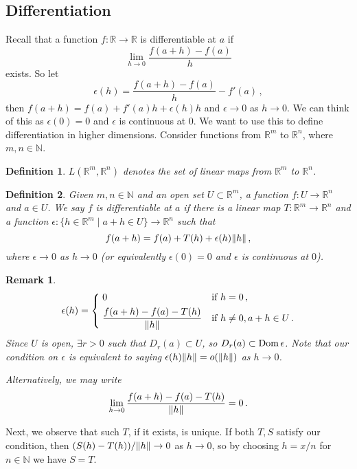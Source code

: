 \documentclass{article}
\theoremstyle{plain}\theoremheaderfont{\normalfont\itshape}\theorembodyfont{\rmfamily}\theoremseparator{.}\newtheorem*{rem}{Remark}\newtheorem*{ex}{Example}\newtheorem*{proof}{Proof}\newtheorem*{altp}{Alternative proof}
\theoremstyle{plain}\theoremheaderfont{\normalfont\bfseries}\theorembodyfont{\rmfamily}\theoremseparator{.}\newtheorem{thm}{Theorem}[section]\newtheorem{lem}[thm]{Lemma}\newtheorem{prop}[thm]{Proposition}\newtheorem*{cor}{Corollary}\newtheorem{defn}[thm]{Definition}\newtheorem{clm}[thm]{Claim}\newtheorem{clminproof}{Claim}
\theoremstyle{break}\theoremheaderfont{\normalfont\itshape}\theorembodyfont{\rmfamily}\theoremseparator{.\medskip}\newtheorem*{proofskip}{Proof}\newtheorem*{exs}{Examples}\newtheorem*{rems}{Remarks}
\theoremstyle{break}\theoremheaderfont{\normalfont\bfseries}\theorembodyfont{\rmfamily}\theoremseparator{.\medskip}\newtheorem{lemskip}[thm]{Lemma}\newtheorem{defnskip}[thm]{Definition}\newtheorem{propskip}[thm]{Proposition}\newtheorem{thmskip}[thm]{Theorem}
\DeclareMathOperator{\Dom}{Dom}
\begin{document}
    \subsection{Differentiation}
    Recall that a function \(f:\mathbb{R}\to\mathbb{R}\) is differentiable at \(a\) if
    \[\lim_{h\to 0}\frac{f(a+h)-f(a)}{h}\]
    exists. So let
    \[\epsilon(h)=\frac{f(a+h)-f(a)}{h}-f'(a)\,,\]
    then \(f(a+h)=f(a)+f'(a)h+\epsilon(h)h\) and \(\epsilon\to 0\) as \(h\to 0\). We can think of this as \(\epsilon(0)=0\) and \(\epsilon\) is continuous at \(0\). We want to use this to define differentiation in higher dimensions. Consider functions from \(\mathbb{R}^m\) to \(\mathbb{R}^n\), where \(m,n\in\mathbb{N}\).
    \begin{defn}
        \(L(\mathbb{R}^m,\mathbb{R}^n)\) denotes the set of linear maps from \(\mathbb{R}^m\) to \(\mathbb{R}^n\).
    \end{defn}
    \begin{defn}
        Given \(m,n\in\mathbb{N}\) and an open set \(U\subset\mathbb{R}^m\), a function \(f:U\to\mathbb{R}^n\) and \(a\in U\). We say \(f\) is \textit{differentiable} at \(a\) if there is a linear map \(T:\mathbb{R}^m\to\mathbb{R}^n\) and a function \(\epsilon:\{h\in\mathbb{R}^m\mid a+h\in U\}\to\mathbb{R}^n\) such that
        \[f(a+h)=f(a)+T(h)+\epsilon(h)\norm{h}\,,\]
        where \(\epsilon\to 0\) as \(h\to 0\) (or equivalently \(\epsilon(0)=0\) and \(\epsilon\) is continuous at \(0\)).
    \end{defn}
    \begin{rem}
        \[\epsilon(h)=\left\{\begin{aligned}
            &\;0 && \text{if }h=0\,,\\
            &\;\frac{f(a+h)-f(a)-T(h)}{\norm{h}} && \text{if }h\ne 0,a+h\in U\,.
        \end{aligned}\right.\]
        Since \(U\) is open, \(\exists r>0\) such that \(D_r(a)\subset U\), so \(D_r(a)\subset\Dom\epsilon\). Note that our condition on \(\epsilon\) is equivalent to saying \(\epsilon(h)\norm{h}=o(\norm{h})\) as \(h\to 0\).
        
        Alternatively, we may write
        \[\lim_{h\to 0}\frac{f(a+h)-f(a)-T(h)}{\norm{h}}=0\,.\]
    \end{rem}

    Next, we observe that such \(T\), if it exists, is unique. If both \(T,S\) satisfy our condition, then \((S(h)-T(h))/\norm{h}\to 0\) as \(h\to 0\), so by choosing \(h=x/n\) for \(n\in\mathbb{N}\) we have \(S=T\).
\end{document}
